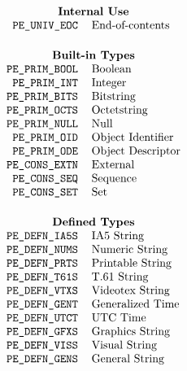 
\normalsize
\[\begin{tabular}{rl}
	\multicolumn{2}{c}{\bf Internal Use}\\
\tt PE\_UNIV\_EOC&	End-of-contents\\[0.2in]
	\multicolumn{2}{c}{\bf Built-in Types}\\
\tt PE\_PRIM\_BOOL&	Boolean\\
\tt PE\_PRIM\_INT&	Integer\\
\tt PE\_PRIM\_BITS&	Bitstring\\
\tt PE\_PRIM\_OCTS&	Octetstring\\
\tt PE\_PRIM\_NULL&	Null\\
\tt PE\_PRIM\_OID&	Object Identifier\\
\tt PE\_PRIM\_ODE&	Object Descriptor\\
\tt PE\_CONS\_EXTN&	External\\
\tt PE\_CONS\_SEQ&	Sequence\\
\tt PE\_CONS\_SET&	Set\\[0.2in]
	\multicolumn{2}{c}{\bf Defined Types}\\
\tt PE\_DEFN\_IA5S&	IA5 String\\
\tt PE\_DEFN\_NUMS&	Numeric String\\
\tt PE\_DEFN\_PRTS&	Printable String\\
\tt PE\_DEFN\_T61S&	T.61 String\\
\tt PE\_DEFN\_VTXS&	Videotex String\\
\tt PE\_DEFN\_GENT&	Generalized Time\\
\tt PE\_DEFN\_UTCT&	UTC Time\\
\tt PE\_DEFN\_GFXS&	Graphics String\\
\tt PE\_DEFN\_VISS&	Visual String\\
\tt PE\_DEFN\_GENS&	General String
\end{tabular}\]

